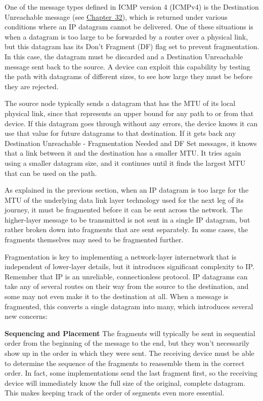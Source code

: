One of the message types defined in ICMP version 4 (ICMPv4) is the
\protect\hypertarget{ch22.htmlux5cux23idx-CHP-22-0806}{}{}Destination
Unreachable message (see \protect\hyperlink{ch32.html}{Chapter~32}),
which is returned under various conditions where an IP datagram cannot
be delivered. One of these situations is when a datagram is too large to
be forwarded by a router over a physical link, but this datagram has its
Don't Fragment (DF) flag set to prevent fragmentation. In this case, the
datagram must be discarded and a Destination Unreachable message sent
back to the source. A device can exploit this capability by testing the
path with datagrams of different sizes, to see how large they must be
before they are rejected.

The source node typically sends a datagram that has the MTU of its local
physical link, since that represents an upper bound for any path to or
from that device. If this datagram goes through without any errors, the
device knows it can use that value for future datagrams to that
destination. If it gets back any Destination Unreachable - Fragmentation
Needed and DF Set messages, it knows that a link between it and the
destination has a smaller MTU. It tries again using a smaller datagram
size, and it continues until it finds the largest MTU that can be used
on the path.

\protect\hypertarget{ch22s02.html}{}{}

As explained in the previous section, when an IP datagram is too large
for the MTU of the underlying data link layer technology used for the
next leg of its journey, it must be fragmented before it can be sent
across the network. The higher-layer message to be transmitted is not
sent in a single IP datagram, but rather broken down into fragments that
are sent separately. In some cases, the fragments themselves may need to
be fragmented further.

\protect\hypertarget{ch22s02.htmlux5cux23idx-CHP-22-0807}{}{}Fragmentation
is key to implementing a network-layer internetwork that is independent
of lower-layer details, but it introduces significant complexity to IP.
Remember that IP is an unreliable, connectionless protocol. IP datagrams
can take any of several routes on their way from the source to the
destination, and some may not even make it to the destination at all.
When a message is fragmented, this converts a single datagram into many,
which introduces several new concerns:

{\textbf{Sequencing and Placement}} The fragments will typically be sent
in sequential order from the beginning of the message to the end, but
they won't necessarily show up in the order in which they were sent. The
receiving device must be able to determine the sequence of the fragments
to reassemble them in the correct order. In fact, some implementations
send the last fragment first, so the receiving device will immediately
know the full size of the original, complete datagram. This makes
keeping track of the order of segments even more essential.

